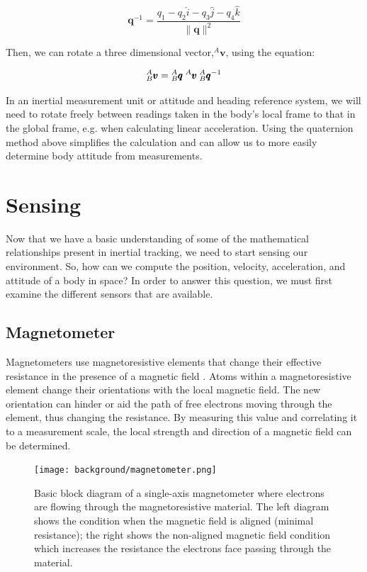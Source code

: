 \begin{equation}
    \pmb{q}^{-1} = \frac{q_1 - q_2\hat{i} - q_3\hat{j} - q_4\hat{k}}{\lVert\pmb{q}\rVert^2}
\end{equation}

Then, we can rotate a three dimensional vector,${}^A\pmb{v}$, using the equation:

\begin{equation}
    {}^A_B \pmb{v} = {}^A_B\pmb{q} \hspace{0.25em} {}^A\pmb{v} \hspace{0.25em} {}^A_B\pmb{q}^{-1}
\end{equation}

In an inertial measurement unit or attitude and heading reference system, we will need to rotate freely between readings taken in the body's local frame to that in the global frame, e.g. when calculating linear acceleration.
Using the quaternion method above simplifies the calculation and can allow us to more easily determine body attitude from measurements.

\section{Sensing} 
Now that we have a basic understanding of some of the mathematical relationships present in inertial tracking, we need to start sensing our environment.
So, how can we compute the position, velocity, acceleration, and attitude of a body in space?
In order to answer this question, we must first examine the different sensors that are available.

\subsection{Magnetometer} 
Magnetometers use magnetoresistive elements that change their effective resistance in the presence of a magnetic field \cite{Corke:2011}.
Atoms within a magnetoresistive element change their orientations with the local magnetic field.
The new orientation can hinder or aid the path of free electrons moving through the element, thus changing the resistance.
By measuring this value and correlating it to a measurement scale, the local strength and direction of a magnetic field can be determined.

\begin{figure}[h!]
    \caption[Magnetometer block diagram]{Basic block diagram of a single-axis magnetometer where electrons are flowing through the magnetoresistive material. The left diagram shows the condition when the magnetic field is aligned (minimal resistance); the right shows the non-aligned magnetic field condition which increases the resistance the electrons face passing through the material.}
    \centering
    \texttt{[image: background/magnetometer.png]}
\end{figure}

